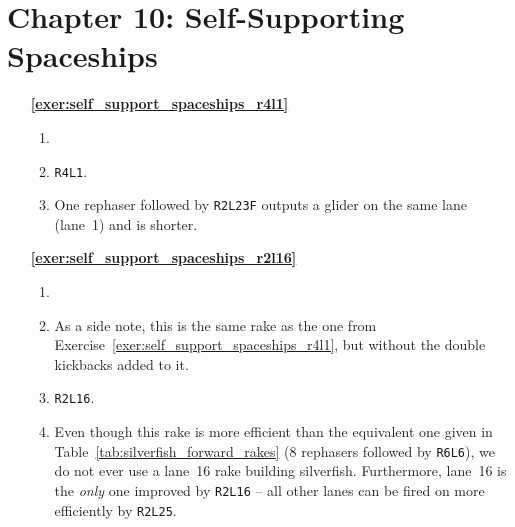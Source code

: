 \section*{Chapter 10: Self-Supporting Spaceships}
\renewcommand{\chapterfolder}{self_support_spaceships/}

\begin{multicols}{2}
	\begin{itemize}[leftmargin=0em]
		\item[\bf\color{ocre}\sffamily\ref{exer:self_support_spaceships_r4l1}] \begin{enumerate}[leftmargin=1.5em,label=\bf\color{ocre}(\alph*)]
			\item {} \\
			
			\item \texttt{R4L1}.
			
			\item One rephaser followed by \texttt{R2L23F} outputs a glider on the same lane (lane~1) and is shorter.\\
		\end{enumerate}
		
		
		\item[\bf\color{ocre}\sffamily\ref{exer:self_support_spaceships_r2l16}] \begin{enumerate}[leftmargin=1.5em,label=\bf\color{ocre}(\alph*)]
			\item {} \\
			
			\item {} 
			
			As a side note, this is the same rake as the one from Exercise~\ref{exer:self_support_spaceships_r4l1}, but without the double kickbacks added to it.\\
			
			\item \texttt{R2L16}.
			
			\item Even though this rake is more efficient than the equivalent one given in Table~\ref{tab:silverfish_forward_rakes} (8 rephasers followed by \texttt{R6L6}), we do not ever use a lane~16 rake building silverfish. Furthermore, lane~16 is the \emph{only} one improved by \texttt{R2L16} -- all other lanes can be fired on more efficiently by \texttt{R2L25}.\\
		\end{enumerate}
	

\end{itemize}
\end{multicols}
